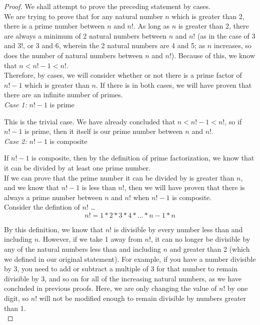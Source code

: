 \documentclass[12pt]{article}
\begin{document}
\begin{proof}
We shall attempt to prove the preceding statement by cases.\\

We are trying to prove that for any natural number $n$ which is greater than 2, there is a prime number between $n$ and $n!$. As long as $n$ is greater than 2, there are always a minimum of 2 natural numbers between $n$ and $n!$ (as in the case of 3 and 3!, or 3 and 6, wherein the 2 natural numbers are 4 and 5; as $n$ increases, so does the number of natural numbers between $n$ and $n!$). Because of this, we know that $n < n! - 1 < n!$. \\

Therefore, by cases, we will consider whether or not there is a prime factor of $n! - 1$ which is greater than $n$. If there is in both cases, we will have proven that there are an infinite number of primes.\\

\textit{Case 1:} $n! - 1$ is prime \\
\bigskip

This is the trivial case. We have already concluded that $n < n! - 1 < n!$, so if $n! - 1$ is prime, then it itself is our prime number between $n$ and $n!$. \\

\textit{Case 2:} $n! - 1$ is composite \\
\bigskip

If $n! - 1$ is composite, then by the definition of prime factorization, we know that it can be divided by at least one prime number. \\

If we can prove that the prime number it can be divided by is greater than $n$, and we know that $n! - 1$ is less than $n!$, then we will have proven that there is always a prime number between $n$ and $n!$ when $n! - 1$ is composite. \\

Consider the defintion of $n!$ \ldots \\

\begin{equation}
n! = 1 * 2 * 3 * 4 * ... * n - 1 * n
\end{equation}
\bigskip

By this definition, we know that $n!$ is divisible by every number less than and including $n$. However, if we take 1 away from $n!$, it can no longer be divisible by any of the natural numbers less than and including $n$ and greater than 2 (which we defined in our original statement). For example, if you have a number divisible by 3, you need to add or subtract a multiple of 3 for that number to remain divisible by 3, and so on for all of the increasing natural numbers, as we have concluded in previous proofs. Here, we are only changing the value of $n!$ by one digit, so $n!$ will not be modified enough to remain divisible by numbers greater than 1.\\


\end{proof}
\end{document}
